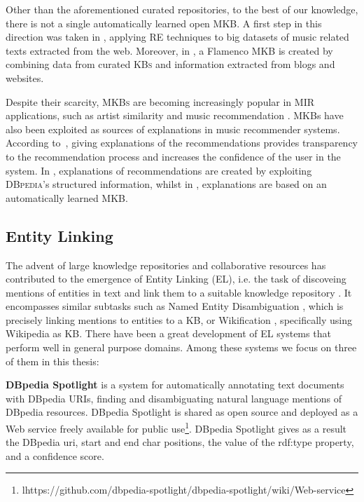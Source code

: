 Other than the aforementioned curated repositories, to the best of our knowledge, there is not a single automatically learned open \textsc{MKB}. A first step in this direction was taken in \citep{Sordo2015,Oramas2014}, applying \textsc{RE} techniques to big datasets of music related texts extracted from the web. Moreover, in \citep{Oramas2015b}, a Flamenco \textsc{MKB} is created by combining data from curated \textsc{KBs} and information extracted from blogs and websites.

Despite their scarcity, \textsc{MKBs} are becoming increasingly popular in MIR applications, such as artist similarity and music recommendation \citep{Celma2008,Oramas2015a,Leal2012,Ostuni2015}. 
MKBs have also been exploited as sources of explanations in music recommender systems. According to~\citep{CelmaandHerrera2008}, giving explanations of the recommendations provides transparency to the recommendation process and increases the confidence of the user in the system. In \citep{Passant2010}, explanations of recommendations are created by exploiting \textsc{DBpedia}'s structured information, whilst in \citep{Sordo2015}, explanations are based on an automatically learned \textsc{MKB}. 


\subsection{Entity Linking}
\label{sec:SOA:nlu:entity_linking}


The advent of large knowledge repositories and collaborative resources has contributed to the emergence of Entity Linking (EL), i.e. the task of discoveing mentions of entities in text and link them to a suitable knowledge repository \citep{Moroetal2014}. 
It encompasses similar subtasks such as Named Entity Disambiguation \citep{BunescuandPasca2006}, which is precisely linking mentions to entities to a KB, or Wikification \citep{MihalceaandCsomai2007}, specifically using Wikipedia as KB.
There have been a great development of EL systems that perform well in general purpose domains. Among these systems we focus on three of them in this thesis:

\noindent \textbf{DBpedia Spotlight} \citep{Mendes2011} is a system for automatically annotating text documents with DBpedia URIs, finding and disambiguating natural language mentions of DBpedia resources. DBpedia Spotlight is shared as open source and deployed as a Web service freely available for public use\footnote{lhttps://github.com/dbpedia-spotlight/dbpedia-spotlight/wiki/Web-service}.
DBpedia Spotlight gives as a result the DBpedia uri, start and end char positions, the value of the rdf:type property, and a confidence score.\\

